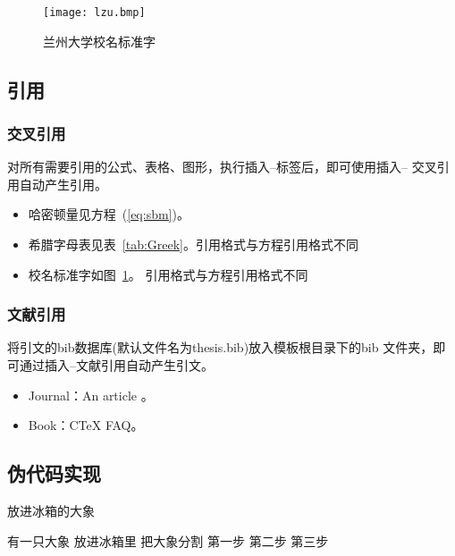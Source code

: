 \documentclass{LZUthesis}
\begin{document}
\begin{figure}[H]
\begin{centering}
\texttt{[image: lzu.bmp]}\\
\end{centering}
\protect\caption{兰州大学校名标准字\label{fig:lzu}}
\end{figure}

\subsection{引用}
\subsubsection{交叉引用}

对所有需要引用的公式、表格、图形，执行插入--标签后，即可使用插入-- 交叉引用自动产生引用。
\begin{itemize}
\item 哈密顿量见方程~(\ref{eq:sbm})。
\item 希腊字母表见表~\ref{tab:Greek}。引用格式与方程引用格式不同
\item 校名标准字如图~\ref{fig:lzu}。 引用格式与方程引用格式不同
\end{itemize}


\subsubsection{文献引用}

将引文的bib数据库(默认文件名为thesis.bib)放入模板根目录下的bib 文件夹，即可通过插入--文献引用自动产生引文。
\begin{itemize}
\item Journal：An article \cite{goossens1997latex}。
\item Book：C\TeX{} FAQ\cite{lamport1994latex}。
\end{itemize}

\subsection{伪代码实现}

\begin{algorithm}
  \caption{放进冰箱的大象}
  \label{算法实例}
  \begin{algorithmic}
  \REQUIRE 有一只大象
  \ENSURE 放进冰箱里
     \STATE 把大象分割
        \ENDIF
    \ENDFOR
   \STATE 第一步
  \STATE 第二步
  \STATE 第三步
  \end{algorithmic}
\end{algorithm}
\end{document}
